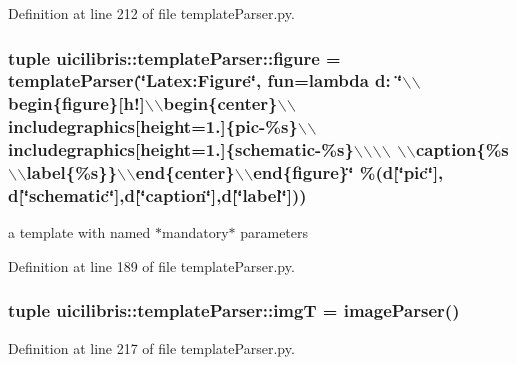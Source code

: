 \-Definition at line 212 of file template\-Parser.\-py.

\hypertarget{namespaceuicilibris_1_1templateParser_ab62a7d06d49e36920493eedea1e78799}{
\subsubsection[{figure}]{\setlength{\rightskip}{0pt plus 5cm}tuple {\bf uicilibris\-::template\-Parser\-::figure} = {\bf template\-Parser}(\char`\"{}\-Latex\-:\-Figure\char`\"{}, fun=lambda d\-: \char`\"{}$\backslash$$\backslash$begin\{{\bf figure}\}\mbox{[}h!\mbox{]}$\backslash$$\backslash$begin\{center\}$\backslash$$\backslash$includegraphics\mbox{[}height=1.\-5cm\mbox{]}\{pic-\/\%s\}$\backslash$$\backslash$includegraphics\mbox{[}height=1.\-5cm\mbox{]}\{schematic-\/\%s\}$\backslash$$\backslash$$\backslash$$\backslash$ $\backslash$$\backslash$caption\{\%s$\backslash$$\backslash$label\{\%s\}\}$\backslash$$\backslash$end\{center\}$\backslash$$\backslash$end\{figure\}\char`\"{} \%(d\mbox{[}\char`\"{}pic\char`\"{}\mbox{]}, d\mbox{[}\char`\"{}schematic\char`\"{}\mbox{]},d\mbox{[}\char`\"{}caption\char`\"{}\mbox{]},d\mbox{[}\char`\"{}label\char`\"{}\mbox{]}))}}\label{namespaceuicilibris_1_1templateParser_ab62a7d06d49e36920493eedea1e78799}


a template with named $\ast$mandatory$\ast$ parameters 



\-Definition at line 189 of file template\-Parser.\-py.

\hypertarget{namespaceuicilibris_1_1templateParser_aa96add71a0f0412a1a5189b52c4fa2a8}{
\subsubsection[{img\-T}]{\setlength{\rightskip}{0pt plus 5cm}tuple {\bf uicilibris\-::template\-Parser\-::img\-T} = {\bf image\-Parser}()}}\label{namespaceuicilibris_1_1templateParser_aa96add71a0f0412a1a5189b52c4fa2a8}


\-Definition at line 217 of file template\-Parser.\-py.

